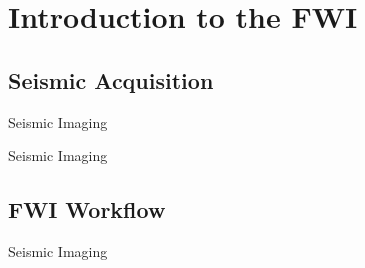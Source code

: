 \section{Introduction to the FWI}
\subsection{Seismic Acquisition}


\begin{frame}{Seismic Imaging}


  \begin{figure}
    \def\svgwidth{1.0\linewidth}
    
  \end{figure}

\end{frame}

\begin{frame}[noframenumbering]{Seismic Imaging}


  \begin{figure}
    \def\svgwidth{1.0\linewidth}
    
  \end{figure}

\end{frame}

\newcommand\hideit[1]{%
  \only<0| handout:1>{\mbox{}}%
  \invisible<0| handout:1>{#1}}



\subsection{FWI Workflow}

\begin{frame}{Seismic Imaging}
\small
\vspace{-3.67cm}
\begin{columns}
\column{\dimexpr\paperwidth-10pt}
\begin{figure}
\def\svgwidth{1.0\linewidth}

\end{figure}
\end{columns}
\end{frame}

